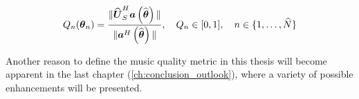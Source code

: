 \begin{equation}
    Q_{n}(\boldsymbol{\theta}_n) = \frac{\|\widehat{\boldsymbol{U}}_S^H\boldsymbol{a}\left(\widehat{\boldsymbol{\theta}}\right)\|}{\|\boldsymbol{a}^H\left(\widehat{\boldsymbol{\theta}}\right)\|}, \quad Q_n \in [0, 1], \quad n \in \{1, \ldots, \widehat{N}\}
    \label{eq:music_quality}
\end{equation}

Another reason to define the \gls{music} quality metric in this thesis will become apparent in the last chapter
(\autoref{ch:conclusion_outlook}), where a variety of possible enhancements will be presented.

\endinput

